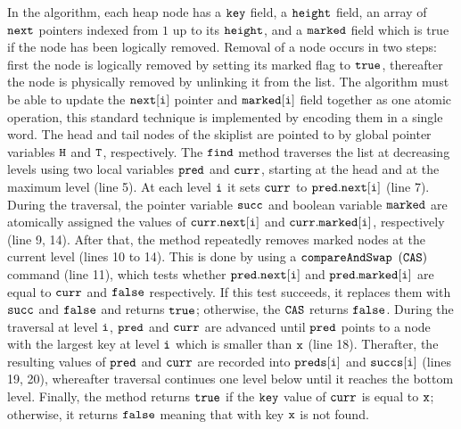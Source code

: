 
In the algorithm, each heap node has a $\tt key$ field, a $\tt height$ field, an array of $\tt next$ pointers indexed from
$1$ up to its $\tt height$, and a $\tt marked$ field which is true if the node has been logically removed. Removal of a node occurs in two steps: first the node is logically removed by setting its marked flag to $\tt true$, thereafter the node is physically removed by unlinking it from the list. The algorithm must be able to update the $\tt next[i]$ pointer and $\tt marked[i]$ field together as one atomic operation, this standard technique is implemented by encoding them in a single word. The head and tail nodes of the skiplist are pointed to by global pointer variables $\tt H$ and $\tt T$, respectively. The $\tt find$ method traverses the list at decreasing levels using two local variables $\tt pred$ and $\tt curr$, starting at the head and at 
the maximum level (line 5). At each level $\tt i$ it sets $\tt curr$ to $\tt pred.next[i]$ (line 7). During the traversal, the pointer variable $\tt succ$ and boolean variable $\tt marked$ are atomically assigned the values of $\tt curr.next[i]$ and $\tt curr.marked[i]$, respectively (line 9, 14). After that, the method repeatedly removes marked nodes at the current level (lines 10 to 14). This is done by using a $\tt compareAndSwap$ $\tt (CAS)$ command (line 11), which tests whether $\tt pred.next[i]$ and $\tt pred.marked[i]$ are equal to $\tt curr$ and $\tt false$ respectively. If this test succeeds, it replaces them with $\tt succ$ and $\tt false$ and returns $\tt true$; otherwise, the $\tt CAS$ returns $\tt false$. During the traversal at level $\tt i$, $\tt pred$ and $\tt curr$ are advanced until $\tt pred$ points to a node with the largest key at level $\tt i$ which is smaller than $\tt x$ (line 18). Therafter, the resulting values of $\tt pred$ and $\tt curr$ are recorded into $\tt preds[i]$ and $\tt succs[i]$ (lines 19, 20), whereafter traversal continues one level below until it reaches the bottom level. Finally, the
method returns $\tt true$ if the $\tt key$ value of $\tt curr$ is equal to $\tt x$; otherwise, it returns $\tt false$ meaning that with key $\tt x$ is not found.



